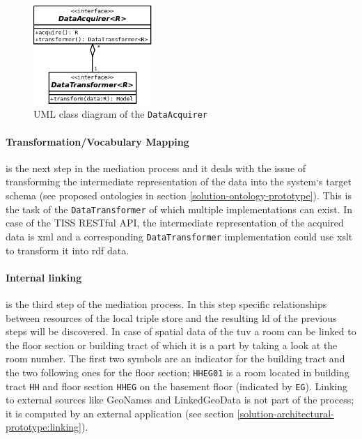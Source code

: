 \documentclass[draft,final]{vutinfth} %
\begin{document}
\begin{figure}[h]
    \centering
    \includegraphics[width=0.4\textwidth]{graphics/solution/architecture/dataacquirer.png}
    \caption{UML class diagram of the \texttt{DataAcquirer}}
    \label{fig:solution-architectural-prototype:acquirer-uml-class-dia}
\end{figure}

\paragraph{Transformation/Vocabulary Mapping} is the next step in the mediation process and it deals with the issue of transforming the intermediate representation of the data into the system`s target schema (see proposed ontologies in section \ref{solution-ontology-prototype}). This is the task of the \texttt{DataTransformer} of which multiple implementations can exist. In case of the TISS RESTful API, the intermediate representation of the acquired data is \gls{xml} and a corresponding \texttt{DataTransformer} implementation could use \gls{xslt} to transform it into \gls{rdf} data.

\paragraph{Internal linking} is the third step of the mediation process. In this step specific relationships between resources of the local triple store and the resulting \gls{ld} of the previous steps will be discovered. In case of spatial data of the \gls{tuv} a room can be linked to the floor section or building tract of which it is a part by taking a look at the room number. The first two symbols are an indicator for the building tract and the two following ones for the floor section; \texttt{HHEG01} is a room located in building tract \texttt{HH} and floor section \texttt{HHEG} on the basement floor (indicated by \texttt{EG}). Linking to external sources like GeoNames and LinkedGeoData is not part of the process; it is computed by an external application (see section \ref{solution-architectural-prototype:linking}).  
\end{document}
